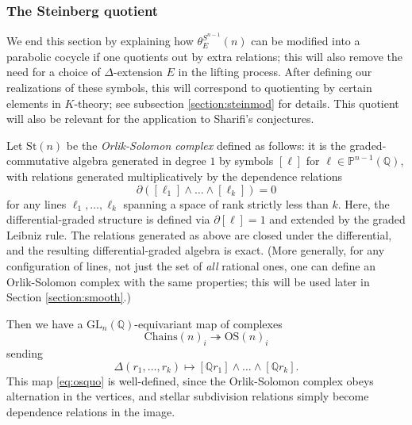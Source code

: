 \documentclass[10pt]{amsart}
\theoremstyle{definition}
\newcommand{\St}{\mathrm{St}}
\newcommand{\OS}{\mathrm{OS}}
\newcommand{\Chains}{\mathrm{Chains}}
\numberwithin{equation}{section}
\begin{document}
    \subsubsection{The Steinberg quotient} \label{section:steinberg}
    We end this section by explaining how $\theta_E^{S^{n-1}}(n)$ can be modified into a parabolic cocycle if one quotients out by extra relations; this will also remove the need for a choice of $\Delta$-extension $E$ in the lifting process. After defining our realizations of these symbols, this will correspond to quotienting by certain elements in $K$-theory; see subsection \ref{section:steinmod} for details. This quotient will also be relevant for the application to Sharifi's conjectures.

    Let $\St(n)$ be the \emph{Orlik-Solomon complex} \cite{OS} defined as follows: it is the graded-commutative algebra generated in degree $1$ by symbols $[\ell]$ for $\ell\in \mathbb{P}^{n-1}(\mathbb{Q})$, with relations generated multiplicatively by the dependence relations
        \[
        \partial ([\ell_1]\wedge \ldots \wedge [\ell_k]) =0
        \]
    for any lines $\ell_1,\ldots, \ell_k$ spanning a space of rank strictly less than $k$. Here, the differential-graded structure is defined via $\partial [\ell] = 1$ and extended by the graded Leibniz rule. The relations generated as above are closed under the differential, and the resulting differential-graded algebra is exact. (More generally, for any configuration of lines, not just the set of \emph{all} rational ones, one can define an Orlik-Solomon complex with the same properties; this will be used later in Section \ref{section:smooth}.)
    
    Then we have a $\mathrm{GL}_n(\mathbb{Q})$-equivariant map of complexes
    \begin{equation} \label{eq:osquo}
    \Chains(n)_i \twoheadrightarrow \OS(n)_i
    \end{equation}
    sending 
    \[
    \Delta(r_1,\ldots, r_k) \mapsto [\mathbb{Q}r_1] \wedge \ldots \wedge [\mathbb{Q}r_k].
    \]
    This map \eqref{eq:osquo} is well-defined, since the Orlik-Solomon complex obeys alternation in the vertices, and stellar subdivision relations simply become dependence relations in the image.
\end{document}
